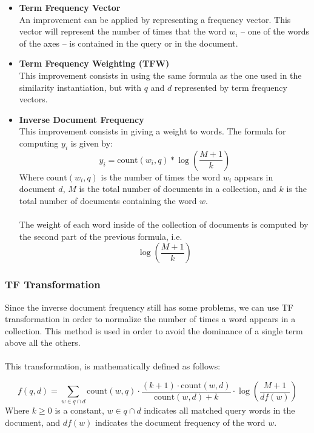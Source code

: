 \documentclass{article}
\begin{document}
\begin{itemize}	
	\item \textbf{Term Frequency Vector}
	\vspace{.2cm} \\
	An improvement can be applied by representing a frequency vector. This vector will represent the number of times that the word $w_i$ -- one of the words of the axes -- is contained in the query or in the document.
	
	\item \textbf{Term Frequency Weighting (TFW)}
	\vspace{.2cm} \\
	This improvement consists in using the same formula as the one used in the similarity instantiation, but with $q$ and $d$ represented by term frequency vectors.
	
	\item \textbf{Inverse Document Frequency}
	\vspace{.2cm} \\
	This improvement consists in giving a weight to words. The formula for computing $y_i$ is given by:
	\[ y_i = \text{count}(w_i, q) * \log \left( \frac{M+1}{k} \right) \]
	Where $\text{count}(w_i, q)$ is the number of times the word $w_i$ appears in document $d$, $M$ is the total number of documents in a collection, and $k$ is the total number of documents containing the word $w$. \\ \\
	The weight of each word inside of the collection of documents is computed by the second part of the previous formula, i.e.
	\[ \log \left( \frac{M+1}{k} \right) \]
\end{itemize}

\subsubsection{TF Transformation}
Since the inverse document frequency still has some problems, we can use TF transformation in order to normalize the number of times a word appears in a collection. This method is used in order to avoid the dominance of a single term above all the others. \\ \\
This transformation, is mathematically defined as follows:

\[ f(q, d) = \sum_{w \in q \cap d} \text{count}(w, q) \cdot \frac{(k+1) \cdot \text{count}(w, d)}{\text{count}(w, d) + k} \cdot \log \left( \frac{M+1}{df(w)} \right) \]
Where $k \geq 0$ is a constant, $w \in q \cap d$ indicates all matched query words in the document, and $df(w)$ indicates the document frequency of the word $w$.
\end{document}
